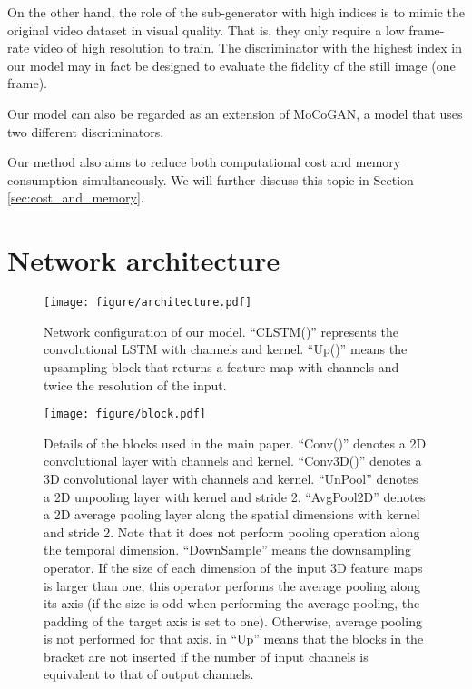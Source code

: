 \documentclass[twocolumn]{svjour3}
\def\Sec#1{Section \ref{sec:#1}}
\begin{document}
On the other hand, the role of the sub-generator with high indices is to mimic the original video dataset in visual quality.
That is, they only require a low frame-rate video of high resolution to train.
The discriminator with the highest index in our model may in fact be designed to evaluate the fidelity of the still image (one frame).


Our model can also be regarded as an extension of MoCoGAN, a model that uses two different discriminators.

Our method also aims to reduce both computational cost and memory consumption simultaneously.
We will further discuss this topic in \Sec{cost_and_memory}.















\section{Network architecture}
\label{sec:videonet}
\begin{figure*}[t!]
\centering
  \texttt{[image: figure/architecture.pdf]}
  \caption{Network configuration of our model. ``CLSTM()'' represents the convolutional LSTM with  channels and  kernel. ``Up()'' means the upsampling block that returns a feature map with  channels and twice the resolution of the input.}
\label{fig:network}

\end{figure*}
\begin{figure*}[t]
\centering
  \texttt{[image: figure/block.pdf]}
  \caption{Details of the blocks used in the main paper. ``Conv()'' denotes a 2D convolutional layer with  channels and  kernel. ``Conv3D()'' denotes a 3D convolutional layer with  channels and  kernel. ``UnPool'' denotes a 2D unpooling layer with  kernel and stride 2. ``AvgPool2D'' denotes a 2D  average pooling layer along the spatial dimensions with  kernel and stride 2. Note that it does not perform pooling operation along the temporal dimension. ``DownSample'' means the downsampling operator. If the size of each dimension of the input 3D feature maps is larger than one, this operator performs the average pooling along its axis (if the size is odd when performing the average pooling, the padding of the target axis is set to one). Otherwise, average pooling is not performed for that axis.  in ``Up'' means that the blocks in the bracket are not inserted if the number of input channels is equivalent to that of output channels.}
  \label{fig:blocks}
\end{figure*}
\end{document}
